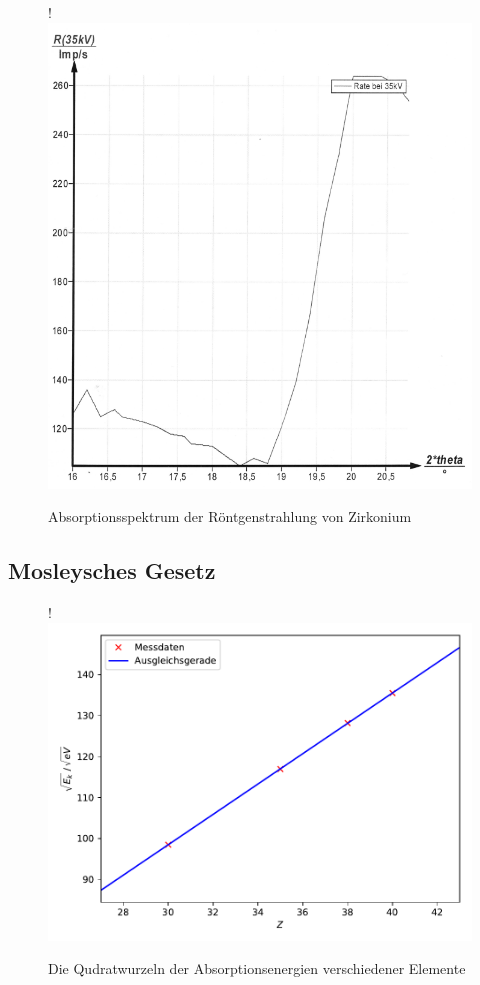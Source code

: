 \begin{figure}[H]!
  \centering
  \includegraphics[scale=0.3]{content/bild4.png}
  \caption{Absorptionsspektrum der Röntgenstrahlung von Zirkonium}
  \label{fig:plot6}
\end{figure}

\subsection{Mosleysches Gesetz}

\begin{figure}[H]!
  \centering
  \includegraphics[scale=0.7]{content/plot1.pdf}
  \caption{Die Qudratwurzeln der Absorptionsenergien verschiedener Elemente}
  \label{fig:plotx}
\end{figure}

